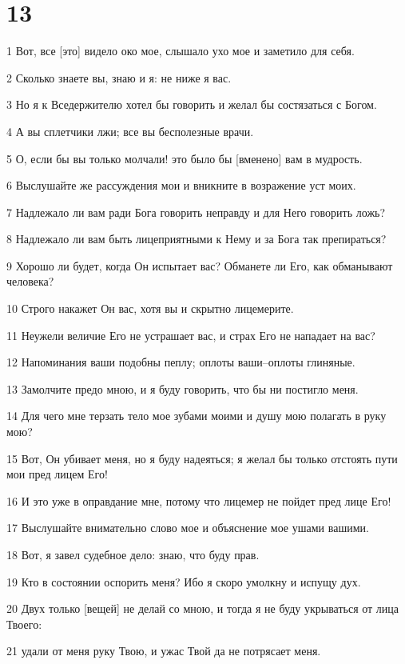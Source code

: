 \chapter{13}

\par 1 Вот, все [это] видело око мое, слышало ухо мое и заметило для себя.
\par 2 Сколько знаете вы, знаю и я: не ниже я вас.
\par 3 Но я к Вседержителю хотел бы говорить и желал бы состязаться с Богом.
\par 4 А вы сплетчики лжи; все вы бесполезные врачи.
\par 5 О, если бы вы только молчали! это было бы [вменено] вам в мудрость.
\par 6 Выслушайте же рассуждения мои и вникните в возражение уст моих.
\par 7 Надлежало ли вам ради Бога говорить неправду и для Него говорить ложь?
\par 8 Надлежало ли вам быть лицеприятными к Нему и за Бога так препираться?
\par 9 Хорошо ли будет, когда Он испытает вас? Обманете ли Его, как обманывают человека?
\par 10 Строго накажет Он вас, хотя вы и скрытно лицемерите.
\par 11 Неужели величие Его не устрашает вас, и страх Его не нападает на вас?
\par 12 Напоминания ваши подобны пеплу; оплоты ваши--оплоты глиняные.
\par 13 Замолчите предо мною, и я буду говорить, что бы ни постигло меня.
\par 14 Для чего мне терзать тело мое зубами моими и душу мою полагать в руку мою?
\par 15 Вот, Он убивает меня, но я буду надеяться; я желал бы только отстоять пути мои пред лицем Его!
\par 16 И это уже в оправдание мне, потому что лицемер не пойдет пред лице Его!
\par 17 Выслушайте внимательно слово мое и объяснение мое ушами вашими.
\par 18 Вот, я завел судебное дело: знаю, что буду прав.
\par 19 Кто в состоянии оспорить меня? Ибо я скоро умолкну и испущу дух.
\par 20 Двух только [вещей] не делай со мною, и тогда я не буду укрываться от лица Твоего:
\par 21 удали от меня руку Твою, и ужас Твой да не потрясает меня.

